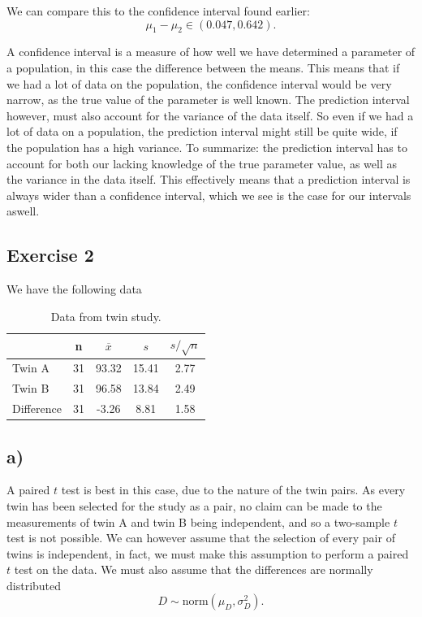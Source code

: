 \documentclass[a4paper, 11pt, titlepage]{article}
\begin{document}
We can compare this to the confidence interval found earlier:
$$\mu_1 - \mu_2 \in (0.047, 0.642).$$

A confidence interval is a measure of how well we have determined a parameter of a population, in this case the difference between the means. This means that if we had a lot of data on the population, the confidence interval would be very narrow, as the true value of the parameter is well known. The prediction interval however, must also account for the variance of the data itself. So even if we had a lot of data on a population, the prediction interval might still be quite wide, if the population has a high variance. To summarize: the prediction interval has to account for both our lacking knowledge of the true parameter value, as well as the variance in the data itself. This effectively means that a prediction interval is always wider than a confidence interval, which we see is the case for our intervals aswell.


\clearpage

\subsection*{Exercise 2}

We have the following data

\begin{table}[h]
\centering
\begin{tabular}{l | c | c | c | c}
& n	& $\overline{x}$ & $s$	& $s/\sqrt{n}$ \\ \hline
Twin A 	& 31 & 93.32 & 15.41 & 2.77 \\ \hline
Twin B 	& 31 & 96.58 & 13.84 & 2.49 \\ \hline
Difference & 31 & -3.26 & 8.81 & 1.58 
\end{tabular}
\caption{Data from twin study.}
\end{table}

\subsection*{a)}
A paired $t$ test is best in this case, due to the nature of the twin pairs. As every twin has been selected for the study as a pair, no claim can be made to the measurements of twin A and twin B being independent, and so a two-sample $t$ test is not possible. We can however assume that the selection of every pair of twins is independent, in fact, we must make this assumption to perform a paired $t$ test on the data. We must also assume that the differences are normally distributed
$$D \sim \mbox{norm}(\mu_D, \sigma_D^2).$$
\end{document}
